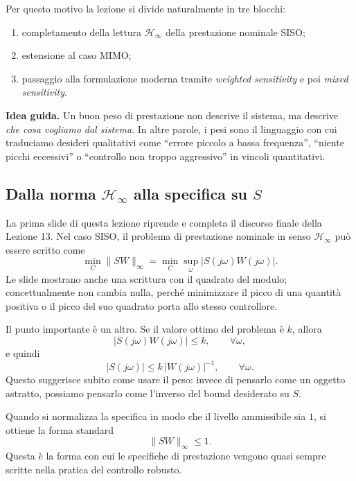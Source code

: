 \documentclass[11pt,a4paper]{article}
\begin{document}
Per questo motivo la lezione si divide naturalmente in tre blocchi:
\begin{enumerate}
    \item completamento della lettura $\mathcal{H}_\infty$ della prestazione nominale SISO;
    \item estensione al caso MIMO;
    \item passaggio alla formulazione moderna tramite \emph{weighted sensitivity} e poi \emph{mixed sensitivity}.
\end{enumerate}

\begin{keybox}
\textbf{Idea guida.} Un buon peso di prestazione non descrive il sistema, ma descrive \emph{che cosa vogliamo dal sistema}. In altre parole, i pesi sono il linguaggio con cui traduciamo desideri qualitativi come ``errore piccolo a bassa frequenza'', ``niente picchi eccessivi'' o ``controllo non troppo aggressivo'' in vincoli quantitativi.
\end{keybox}

\subsection{Dalla norma \texorpdfstring{$\mathcal{H}_\infty$}{Hinf} alla specifica su \texorpdfstring{$S$}{S}}

La prima slide di questa lezione riprende e completa il discorso finale della Lezione 13. Nel caso SISO, il problema di prestazione nominale in senso $\mathcal{H}_\infty$ pu\`o essere scritto come
$$
\min_C \|SW\|_\infty
=
\min_C \sup_\omega |S(j\omega)W(j\omega)|.
$$
Le slide mostrano anche una scrittura con il quadrato del modulo; concettualmente non cambia nulla, perch\'e minimizzare il picco di una quantit\`a positiva o il picco del suo quadrato porta allo stesso controllore.

Il punto importante \`e un altro. Se il valore ottimo del problema \`e $k$, allora
$$
|S(j\omega)W(j\omega)|\le k,
\qquad
\forall\omega,
$$
e quindi
$$
|S(j\omega)|\le k\,|W(j\omega)|^{-1},
\qquad
\forall\omega.
$$
Questo suggerisce subito come usare il peso: invece di pensarlo come un oggetto astratto, possiamo pensarlo come l'inverso del bound desiderato su $S$.

Quando si normalizza la specifica in modo che il livello ammissibile sia $1$, si ottiene la forma standard
$$
\|SW\|_\infty\le1.
$$
Questa \`e la forma con cui le specifiche di prestazione vengono quasi sempre scritte nella pratica del controllo robusto.
\end{document}
